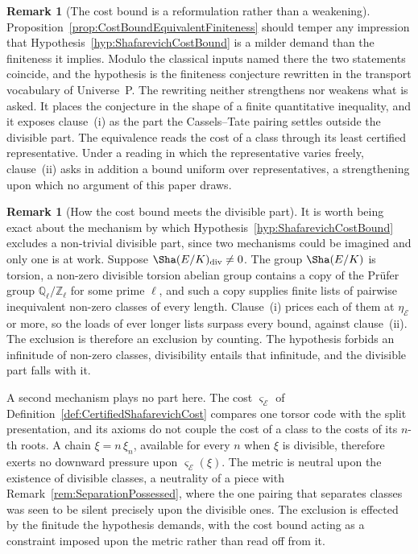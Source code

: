 \documentclass[10pt, reqno]{amsart}
\theoremstyle{plain}
\theoremstyle{definition}
\newtheorem{remark}[theorem]{Remark}
\theoremstyle{plain}
\newcommand{\Q}{\mathbb{Q}}
\newcommand{\Z}{\mathbb{Z}}
\begin{document}
\begin{remark}[The cost bound is a reformulation rather than a weakening]
\label{rem:CostBoundReformulation}
Proposition~\ref{prop:CostBoundEquivalentFiniteness} should temper any impression that Hypothesis~\ref{hyp:ShafarevichCostBound} is a milder demand than the finiteness it implies. Modulo the classical inputs named there the two statements coincide, and the hypothesis is the finiteness conjecture rewritten in the transport vocabulary of Universe~P. The rewriting neither strengthens nor weakens what is asked. It places the conjecture in the shape of a finite quantitative inequality, and it exposes clause~\textup{(i)} as the part the Cassels--Tate pairing settles outside the divisible part. The equivalence reads the cost of a class through its least certified representative. Under a reading in which the representative varies freely, clause~\textup{(ii)} asks in addition a bound uniform over representatives, a strengthening upon which no argument of this paper draws.
\end{remark}

\begin{remark}[How the cost bound meets the divisible part]
\label{rem:CostBoundMeetsDivisibility}
It is worth being exact about the mechanism by which Hypothesis~\ref{hyp:ShafarevichCostBound} excludes a non-trivial divisible part, since two mechanisms could be imagined and only one is at work. Suppose $\Sha(E/K)_{\mathrm{div}}\neq 0$. The group $\Sha(E/K)$ is torsion, a non-zero divisible torsion abelian group contains a copy of the Pr\"ufer group $\Q_{\ell}/\Z_{\ell}$ for some prime $\ell$, and such a copy supplies finite lists of pairwise inequivalent non-zero classes of every length. Clause~\textup{(i)} prices each of them at $\eta_{\mathcal{E}}$ or more, so the loads of ever longer lists surpass every bound, against clause~\textup{(ii)}. The exclusion is therefore an exclusion by counting. The hypothesis forbids an infinitude of non-zero classes, divisibility entails that infinitude, and the divisible part falls with it.

A second mechanism plays no part here. The cost $\varsigma_{\mathcal{E}}$ of Definition~\ref{def:CertifiedShafarevichCost} compares one torsor code with the split presentation, and its axioms do not couple the cost of a class to the costs of its $n$-th roots. A chain $\xi=n\,\xi_{n}$, available for every $n$ when $\xi$ is divisible, therefore exerts no downward pressure upon $\varsigma_{\mathcal{E}}(\xi)$. The metric is neutral upon the existence of divisible classes, a neutrality of a piece with Remark~\ref{rem:SeparationPossessed}, where the one pairing that separates classes was seen to be silent precisely upon the divisible ones. The exclusion is effected by the finitude the hypothesis demands, with the cost bound acting as a constraint imposed upon the metric rather than read off from it.
\end{remark}
\end{document}

